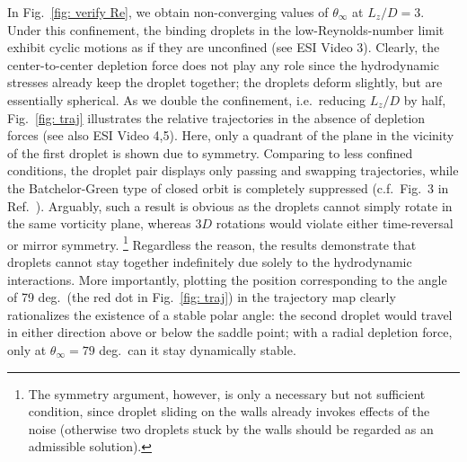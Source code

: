 In Fig.\ \ref{fig: verify Re}, we obtain non-converging values of $\theta_\infty$ at $L_z/D=3$. Under this confinement, the binding droplets in the low-Reynolds-number limit exhibit cyclic motions as if they are unconfined (see ESI Video 3). Clearly, the center-to-center depletion force does not play any role since the hydrodynamic stresses already keep the droplet together; the droplets deform slightly, but are essentially spherical. As we double the confinement, i.e.\ reducing $L_z/D$ by half, Fig.\ \ref{fig: traj} illustrates the relative trajectories in the absence of depletion forces (see also ESI Video 4,5). Here, only a quadrant of the plane in the vicinity of the first droplet is shown due to symmetry. Comparing to less confined conditions, the droplet pair displays only passing and swapping trajectories, while the Batchelor-Green type of closed orbit is completely suppressed (c.f.\ Fig.\ 3 in Ref.\ \cite{zurita-gotor_2007}). Arguably, such a result is obvious as the droplets cannot simply rotate in the same vorticity plane, whereas $3D$ rotations would violate either time-reversal or mirror symmetry. \footnote{The symmetry argument, however, is only a necessary but not sufficient condition, since droplet sliding on the walls already invokes effects of the noise (otherwise two droplets stuck by the walls should be regarded as an admissible solution).} Regardless the reason, the results demonstrate that droplets cannot stay together indefinitely due solely to the hydrodynamic interactions. More importantly, plotting the position corresponding to the angle of 79 deg.\ (the red dot in Fig.\ \ref{fig: traj}) in the trajectory map clearly rationalizes the existence of a stable polar angle: the second droplet would travel in either direction above or below the saddle point; with a radial depletion force, only at $\theta_\infty=79$ deg.\ can it stay dynamically stable.



